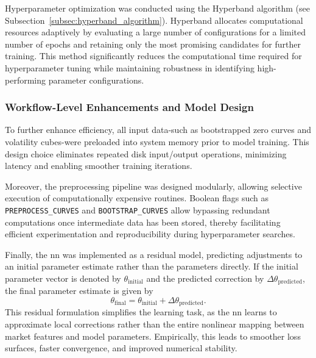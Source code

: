 Hyperparameter optimization was conducted using the Hyperband algorithm (see Subsection~\ref{subsec:hyperband_algorithm}). Hyperband allocates computational resources adaptively by evaluating a large number of configurations for a limited number of epochs and retaining only the most promising candidates for further training. This method significantly reduces the computational time required for hyperparameter tuning while maintaining robustness in identifying high-performing parameter configurations.

\subsubsection{Workflow-Level Enhancements and Model Design}
To further enhance efficiency, all input data-such as bootstrapped zero curves and volatility cubes-were preloaded into system memory prior to model training. This design choice eliminates repeated disk input/output operations, minimizing latency and enabling smoother training iterations.

Moreover, the preprocessing pipeline was designed modularly, allowing selective execution of computationally expensive routines. Boolean flags such as \texttt{PREPROCESS\_CURVES} and \texttt{BOOTSTRAP\_CURVES} allow bypassing redundant computations once intermediate data has been stored, thereby facilitating efficient experimentation and reproducibility during hyperparameter searches.

Finally, the \ac{nn} was implemented as a residual model, predicting adjustments to an initial parameter estimate rather than the parameters directly. If the initial parameter vector is denoted by $\theta_{\text{initial}}$ and the predicted correction by $\Delta \theta_{\text{predicted}}$, the final parameter estimate is given by
\begin{equation}
	\theta_{\text{final}} = \theta_{\text{initial}} + \Delta \theta_{\text{predicted}}.
\end{equation}
This residual formulation simplifies the learning task, as the \ac{nn} learns to approximate local corrections rather than the entire nonlinear mapping between market features and model parameters. Empirically, this leads to smoother loss surfaces, faster convergence, and improved numerical stability.

